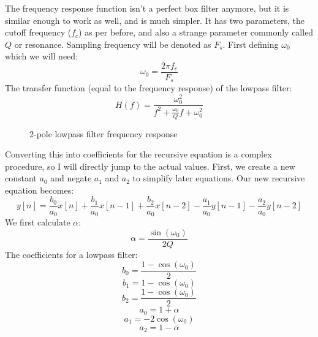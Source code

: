 \documentclass[11pt,a4paper]{article}
\begin{document}
The frequency response function isn't a perfect box filter anymore, but it is similar enough to work as well, and is much simpler.
It has two parameters, the cutoff frequency (\(f_c\)) as per before, and also a strange parameter commonly called \(Q\) or resonance.
Sampling frequency will be denoted as \(F_s\).
First defining $\omega_0$ which we will need:
\begin{equation}
\omega_0 = \frac{2{\pi}f_c}{F_s}
\end{equation}
The transfer function (equal to the frequency response) of the lowpass filter:
\begin{equation}
H(f) = \frac{\omega_0^2}{f^2 + \frac{\omega_0}{Q}f + \omega_0^2}
\end{equation}



\begin{figure}[ht]
\caption{2-pole lowpass filter frequency response}
\centering
{}

\end{figure}

Converting this into coefficients for the recursive equation is a complex procedure, so I will directly jump to the actual values.
First, we create a new constant $a_0$ and negate $a_1$ and $a_2$ to simplify later equations. Our new recursive equation becomes:
\begin{equation}
y[n] = \frac{b_0}{a_0}x[n] + \frac{b_1}{a_0}x[n-1] + \frac{b_2}{a_0}x[n-2] - \frac{a_1}{a_0}y[n-1] - \frac{a_2}{a_0}y[n-2]
\end{equation}
We first calculate $\alpha$:
\begin{equation}
\alpha = \frac{\sin(\omega_0)}{2Q}
\end{equation}
The coefficients for a lowpass filter:
\begin{equation}
b_0 = \frac{1 - \cos(\omega_0)}{2}
\end{equation}
\begin{equation}
b_1 = 1 - \cos(\omega_0)
\end{equation}
\begin{equation}
b_2 = \frac{1 - \cos(\omega_0)}{2}
\end{equation}
\begin{equation}
a_0 = 1 + \alpha
\end{equation}
\begin{equation}
a_1 = -2\cos(\omega_0)
\end{equation}
\begin{equation}
a_2 = 1 - \alpha
\end{equation}
\end{document}
